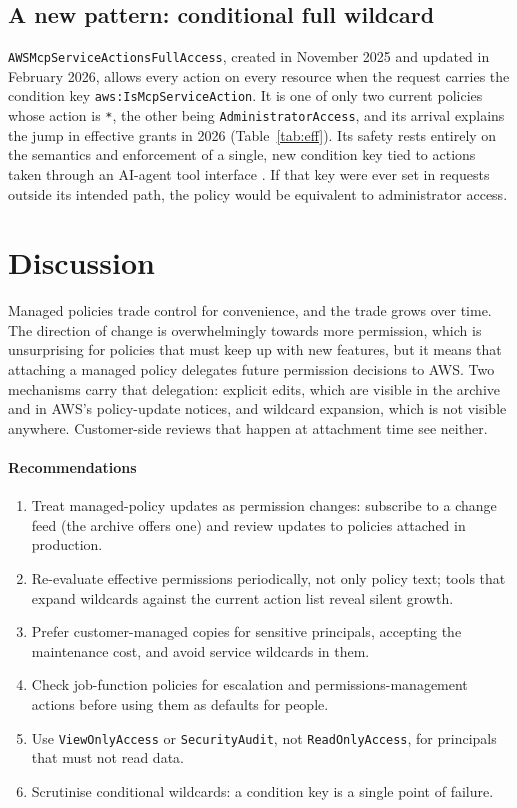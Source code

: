 \documentclass[journal]{IEEEtran}
\begin{document}
\subsection{A new pattern: conditional full wildcard}
\label{sec:mcp}
\texttt{AWSMcpServiceActionsFullAccess}, created in November 2025 and updated in February 2026, allows every action on every resource when
the request carries the condition key \texttt{aws:IsMcpServiceAction}. It is one of only two current policies whose action is \texttt{*},
the other being \texttt{AdministratorAccess}, and its arrival explains the jump in effective grants in 2026 (Table~\ref{tab:eff}). Its
safety rests entirely on the semantics and enforcement of a single, new condition key tied to actions taken through an AI-agent tool
interface \cite{mcp2024}. If that key were ever set in requests outside its intended path, the policy would be equivalent to
administrator access.

\section{Discussion}
\label{sec:disc}
Managed policies trade control for convenience, and the trade grows over time. The direction of change is overwhelmingly towards more
permission, which is unsurprising for policies that must keep up with new features, but it means that attaching a managed policy delegates
future permission decisions to AWS. Two mechanisms carry that delegation: explicit edits, which are visible in the archive and in AWS's
policy-update notices, and wildcard expansion, which is not visible anywhere. Customer-side reviews that happen at attachment time see
neither.

\paragraph*{Recommendations}
\begin{enumerate}
\item Treat managed-policy updates as permission changes: subscribe to a change feed (the archive offers one) and review updates to
policies attached in production.
\item Re-evaluate effective permissions periodically, not only policy text; tools that expand wildcards against the current action list
reveal silent growth.
\item Prefer customer-managed copies for sensitive principals, accepting the maintenance cost, and avoid service wildcards in them.
\item Check job-function policies for escalation and permissions-management actions before using them as defaults for people.
\item Use \texttt{ViewOnlyAccess} or \texttt{SecurityAudit}, not \texttt{ReadOnlyAccess}, for principals that must not read data.
\item Scrutinise conditional wildcards: a condition key is a single point of failure.
\end{enumerate}
\end{document}
